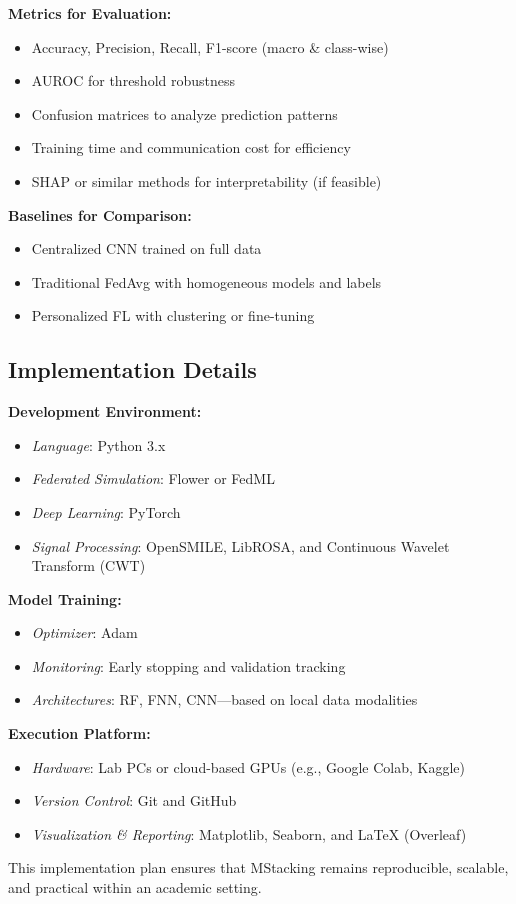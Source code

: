\textbf{Metrics for Evaluation:}
\begin{itemize}
    \item Accuracy, Precision, Recall, F1-score (macro \& class-wise)
    \item AUROC for threshold robustness
    \item Confusion matrices to analyze prediction patterns
    \item Training time and communication cost for efficiency
    \item SHAP or similar methods for interpretability (if feasible)
\end{itemize}

\textbf{Baselines for Comparison:}
\begin{itemize}
    \item Centralized CNN trained on full data
    \item Traditional FedAvg with homogeneous models and labels
    \item Personalized FL with clustering or fine-tuning
\end{itemize}

\subsection{Implementation Details}
\label{sec:implementation}

\textbf{Development Environment:}
\begin{itemize}
    \item \textit{Language}: Python 3.x
    \item \textit{Federated Simulation}: Flower or FedML
    \item \textit{Deep Learning}: PyTorch
    \item \textit{Signal Processing}: OpenSMILE, LibROSA, and Continuous Wavelet Transform (CWT)
\end{itemize}

\textbf{Model Training:}
\begin{itemize}
    \item \textit{Optimizer}: Adam
    \item \textit{Monitoring}: Early stopping and validation tracking
    \item \textit{Architectures}: RF, FNN, CNN—based on local data modalities
\end{itemize}

\textbf{Execution Platform:}
\begin{itemize}
    \item \textit{Hardware}: Lab PCs or cloud-based GPUs (e.g., Google Colab, Kaggle)
    \item \textit{Version Control}: Git and GitHub
    \item \textit{Visualization \& Reporting}: Matplotlib, Seaborn, and LaTeX (Overleaf)
\end{itemize}

This implementation plan ensures that MStacking remains reproducible, scalable, and practical within an academic setting.
